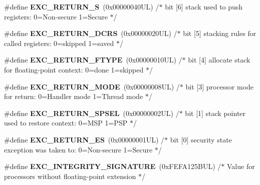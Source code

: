 \begin{DoxyCompactItemize}
\#define {\bfseries E\+X\+C\+\_\+\+R\+E\+T\+U\+R\+N\+\_\+S}~(0x00000040\+U\+L)     /$\ast$ bit \mbox{[}6\mbox{]} stack used to push registers\+: 0=\+Non-\/secure 1=\+Secure          $\ast$/
\item 
\mbox{\label{group___c_m_s_i_s___core___n_v_i_c_functions_ga0a0f2c03b4aef2c02bdae044bda1324b}} 
\#define {\bfseries E\+X\+C\+\_\+\+R\+E\+T\+U\+R\+N\+\_\+\+D\+C\+RS}~(0x00000020\+U\+L)     /$\ast$ bit \mbox{[}5\mbox{]} stacking rules for called registers\+: 0=skipped 1=saved       $\ast$/
\item 
\mbox{\label{group___c_m_s_i_s___core___n_v_i_c_functions_ga342b51c3eec59822bf206e24ef881a9e}} 
\#define {\bfseries E\+X\+C\+\_\+\+R\+E\+T\+U\+R\+N\+\_\+\+F\+T\+Y\+PE}~(0x00000010\+U\+L)     /$\ast$ bit \mbox{[}4\mbox{]} allocate stack for floating-\/point context\+: 0=done 1=skipped  $\ast$/
\item 
\mbox{\label{group___c_m_s_i_s___core___n_v_i_c_functions_gabb65f847769a7807395b2739cc9702d0}} 
\#define {\bfseries E\+X\+C\+\_\+\+R\+E\+T\+U\+R\+N\+\_\+\+M\+O\+DE}~(0x00000008\+U\+L)     /$\ast$ bit \mbox{[}3\mbox{]} processor mode for return\+: 0=\+Handler mode 1=\+Thread mode      $\ast$/
\item 
\mbox{\label{group___c_m_s_i_s___core___n_v_i_c_functions_ga686922b26c29eac540f53a6213627466}} 
\#define {\bfseries E\+X\+C\+\_\+\+R\+E\+T\+U\+R\+N\+\_\+\+S\+P\+S\+EL}~(0x00000002\+U\+L)     /$\ast$ bit \mbox{[}1\mbox{]} stack pointer used to restore context\+: 0=\+M\+S\+P 1=\+P\+S\+P           $\ast$/
\item 
\mbox{\label{group___c_m_s_i_s___core___n_v_i_c_functions_gac939dbf69d3063c76a28516a4ae84db7}} 
\#define {\bfseries E\+X\+C\+\_\+\+R\+E\+T\+U\+R\+N\+\_\+\+ES}~(0x00000001\+U\+L)     /$\ast$ bit \mbox{[}0\mbox{]} security state exception was taken to\+: 0=\+Non-\/secure 1=\+Secure $\ast$/
\item 
\mbox{\label{group___c_m_s_i_s___core___n_v_i_c_functions_ga7d1b21b2d863ccd9e23a3295b3173155}} 
\#define {\bfseries E\+X\+C\+\_\+\+I\+N\+T\+E\+G\+R\+I\+T\+Y\+\_\+\+S\+I\+G\+N\+A\+T\+U\+RE}~(0x\+F\+E\+F\+A125\+B\+U\+L)     /$\ast$ Value for processors without floating-\/point extension                $\ast$/

\end{DoxyCompactItemize}
